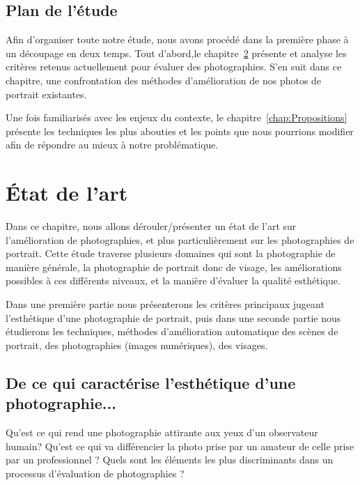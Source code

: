 \documentclass[11pt, french]{report-rd-info}
\begin{document}
\section{Plan de l'étude}
Afin d'organiser toute notre étude, nous avons procédé dans la première phase à un découpage en deux temps. Tout d'abord,le chapitre~\ref{chap:EtatArt} présente et analyse les critères retenus actuellement pour évaluer des photographies. S'en suit dans ce chapitre, une confrontation des méthodes d'amélioration de nos photos de portrait existantes.

Une fois familiarisés avec les enjeux du contexte, le chapitre~\ref{chap:Propositions} présente les techniques les plus abouties et les points que nous pourrions modifier afin de répondre au mieux à notre problématique.
\chapter{\'Etat de l'art}
\label{chap:EtatArt}
Dans ce chapitre, nous allons dérouler/présenter un état de l’art sur l’amélioration de photographies, et plus particulièrement sur les photographies de portrait. Cette étude traverse plusieurs domaines qui sont la photographie de manière générale, la photographie de portrait donc de visage, les améliorations possibles à ces différents niveaux, et la manière d’évaluer la qualité esthétique.

Dans une première partie nous présenterons les critères principaux jugeant l’esthétique d’une photographie de portrait, puis dans une seconde partie nous étudierons les techniques, méthodes d’amélioration automatique des scènes de portrait, des photographies (images numériques), des visages.
\section{De ce qui caractérise l’esthétique d’une photographie...}
Qu’est ce qui rend une photographie attirante aux yeux d’un observateur humain? Qu’est ce qui va différencier la photo prise par un amateur de celle prise par un professionnel ? Quels sont les éléments les plus discriminants dans un processus d'évaluation de photographies ?
\end{document}
